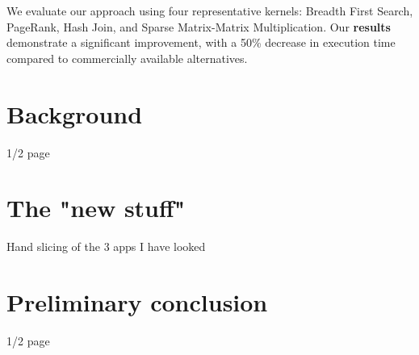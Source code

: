 \documentclass{acaces}
\begin{document}
We evaluate our approach using four representative kernels: Breadth First Search, PageRank, Hash Join, and Sparse Matrix-Matrix Multiplication.
Our \textbf{results} demonstrate a significant improvement, with a 50\% decrease in execution time compared to commercially available alternatives.

\section{Background}

1/2 page

\section{The "new stuff"} 

Hand slicing of the 3 apps I have looked

\section{Preliminary conclusion}

1/2 page


\end{document}
